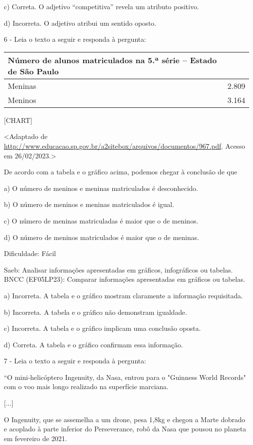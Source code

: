 c) Correta. O adjetivo ``competitiva'' revela um atributo positivo.

d) Incorreta. O adjetivo atribui um sentido oposto.

6 - Leia o texto a seguir e responda à pergunta:

\begin{longtable}[]{@{}ll@{}}
\toprule
Número de alunos matriculados na 5.ª série -- Estado de São
Paulo\tabularnewline
\midrule
\endhead
Meninas & 2.809\tabularnewline
Meninos & 3.164\tabularnewline
\bottomrule
\end{longtable}

{{[}CHART{]}}

\textless{}Adaptado de
\url{http://www.educacao.sp.gov.br/a2sitebox/arquivos/documentos/967.pdf}.
Acesso em 26/02/2023.\textgreater{}

De acordo com a tabela e o gráfico acima, podemos chegar à conclusão de
que

a) O número de meninos e meninas matriculados é desconhecido.

b) O número de meninos e meninas matriculados é igual.

c) O número de meninas matriculadas é maior que o de meninos.

d) O número de meninos matriculados é maior que o de meninas.

Dificuldade: Fácil

Saeb: Analisar informações apresentadas em gráficos, infográficos ou
tabelas. BNCC (EF05LP23): Comparar informações apresentadas em gráficos
ou tabelas.

a) Incorreta. A tabela e o gráfico mostram claramente a informação
requisitada.

b) Incorreta. A tabela e o gráfico não demonstram igualdade.

c) Incorreta. A tabela e o gráfico implicam uma conclusão oposta.

d) Correta. A tabela e o gráfico confirmam essa informação.

7 - Leia o texto a seguir e responda à pergunta:

``O mini-helicóptero Ingenuity, da Nasa, entrou para o "Guinness World
Records" com o voo mais longo realizado na superfície marciana.

{[}...{]}

O Ingenuity, que se assemelha a um drone, pesa 1,8kg e chegou a Marte
dobrado e acoplado à parte inferior do Perseverance, robô da Nasa que
pousou no planeta em fevereiro de 2021.


